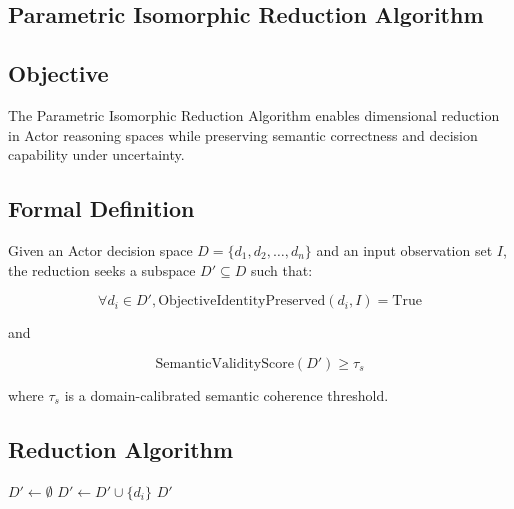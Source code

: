 \documentclass[12pt,a4paper]{article}
\begin{document}
\begin{appendices}

\section{Parametric Isomorphic Reduction Algorithm}

\subsection{Objective}

The Parametric Isomorphic Reduction Algorithm enables dimensional reduction in Actor reasoning spaces while preserving semantic correctness and decision capability under uncertainty.

\subsection{Formal Definition}

Given an Actor decision space $D = \{d_1, d_2, \ldots, d_n\}$ and an input observation set $I$, the reduction seeks a subspace $D' \subseteq D$ such that:

\begin{equation}
\forall d_i \in D', \text{ObjectiveIdentityPreserved}(d_i, I) = \text{True}
\end{equation}

and

\begin{equation}
\text{SemanticValidityScore}(D') \geq \tau_s
\end{equation}

where $\tau_s$ is a domain-calibrated semantic coherence threshold.

\subsection{Reduction Algorithm}

\begin{algorithm}
\caption{Parametric Isomorphic Reduction}
\begin{algorithmic}[1]
    \State $D' \gets \emptyset$
                \State $D' \gets D' \cup \{d_i\}$
            \EndIf
        \EndIf
    \EndFor
    \State \Return $D'$
\EndFunction
\end{algorithmic}
\end{algorithm}


\end{appendices}
\end{document}
